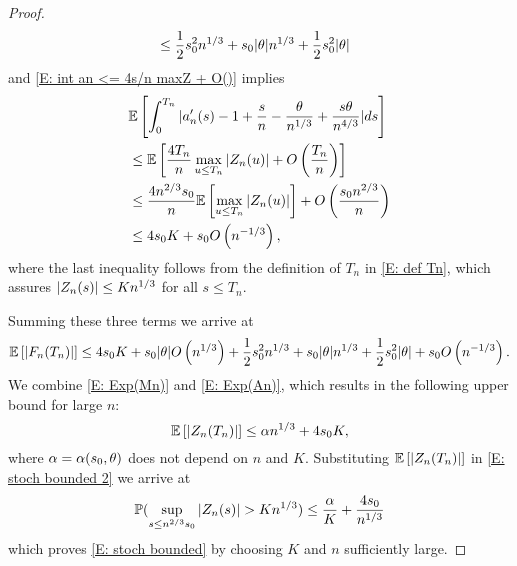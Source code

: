 \begin{proof}
\begin{equation}
\begin{aligned}
	&\leq \frac{1}{2}s_0^2n^{1 / 3} + s_0|\theta|n^{1 / 3} + \frac{1}{2}s_0^2|\theta|
	\end{aligned}
	\end{equation}
	and \eqref{E: int an <= 4s/n maxZ + O()} implies
	\begin{equation}
	\begin{aligned}
	&\mathbb{E} \left[ \int_{0}^{T_n} |a'_n(s) - 1 + \frac{s}{n} - \frac{\theta}{n^{1 / 3}} + \frac{s\theta}{n^{4 / 3}}|ds \right] \\
	&\leq \mathbb{E} \left[  \frac{4T_n}{n} \max_{u \leq T_n}|Z_n(u)| + O\left(\frac{T_n}{n}\right)  \right] \\
	&\leq \frac{4n^{2 / 3}s_0}{n} \mathbb{E} \left[ \max_{u \leq T_n}|Z_n(u)| \right] + O\left(\frac{s_0n^{2 / 3}}{n}\right) \\
	&\leq 4s_0 K + s_0O\left(n^{-1 / 3}\right),
	\end{aligned}
	\end{equation}
	where the last inequality follows from the definition of $T_n$ in \eqref{E: def Tn},
	which assures $|Z_n(s)| \leq Kn^{1 / 3}$ for all $s \leq T_n$. 
	
	Summing these three terms we arrive at
	\begin{equation} \label{E: Exp(An)}
	\mathbb{E} \left[ |F_n(T_n)| \right] \leq 4 s_0 K + s_0|\theta|O\left(n^{1 / 3}\right) + \frac{1}{2}s_0^2n^{1 / 3} + s_0|\theta|n^{1 / 3} + \frac{1}{2}s_0^2|\theta| + s_0O\left(n^{-1 / 3}\right).
	\end{equation}
	We combine \eqref{E: Exp(Mn)} and \eqref{E: Exp(An)}, 
	which results in the following upper bound for large $n$:
	\begin{equation} \label{E: bound Zn}
	\mathbb{E} \left[ |Z_n(T_n)| \right] \leq \alpha n^{1 / 3} + 4s_0K,
	\end{equation}
	where $\alpha = \alpha(s_0,\theta)$ does not depend on $n$ and $K$. 
	Substituting $\mathbb{E} \left[ |Z_n(T_n)| \right]$ in \eqref{E: stoch bounded 2} we arrive at
	\begin{equation}
	\mathbb{P}( \sup_{s\leq n^{2/3} s_0} |Z_n(s)| > K n^{1 / 3} ) \leq \frac{\alpha}{K} + \frac{4s_0}{n^{1 / 3}}
	\end{equation}
	which proves \eqref{E: stoch bounded} by choosing $K$ and $n$ sufficiently large.
\end{proof}


